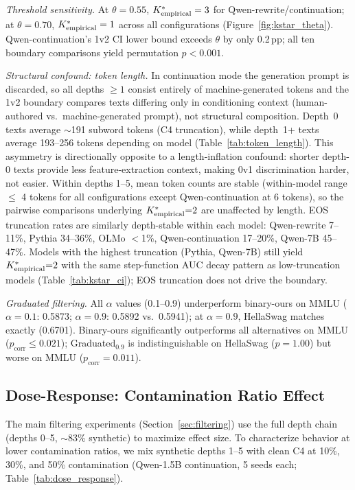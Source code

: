\emph{Threshold sensitivity.}
At $\theta = 0.55$, ${K^*_{\text{empirical}}} = 3$ for Qwen-rewrite/continuation; at $\theta = 0.70$, ${K^*_{\text{empirical}}} = 1$ across all configurations (Figure~\ref{fig:kstar_theta}).
Qwen-continuation's 1v2 CI lower bound exceeds $\theta$ by only 0.2\,pp; all ten boundary comparisons yield permutation $p < 0.001$.

\emph{Structural confound: token length.}
In continuation mode the generation prompt is discarded, so all depths $\geq 1$ consist entirely of machine-generated tokens and the 1v2 boundary compares texts differing only in conditioning context (human-authored vs.\ machine-generated prompt), not structural composition.
Depth~0 texts average ${\sim}$191 subword tokens (C4 truncation), while depth~1+ texts average 193--256 tokens depending on model (Table~\ref{tab:token_length}).
This asymmetry is directionally opposite to a length-inflation confound: shorter depth-0 texts provide less feature-extraction context, making 0v1 discrimination harder, not easier.
Within depths 1--5, mean token counts are stable (within-model range $\leq$ 4 tokens for all configurations except Qwen-continuation at 6 tokens), so the pairwise comparisons underlying ${K^*_{\text{empirical}}}{=}2$ are unaffected by length.
EOS truncation rates are similarly depth-stable within each model: Qwen-rewrite 7--11\%, Pythia 34--36\%, OLMo $<$1\%, Qwen-continuation 17--20\%, Qwen-7B 45--47\%.
Models with the highest truncation (Pythia, Qwen-7B) still yield ${K^*_{\text{empirical}}}{=}2$ with the same step-function AUC decay pattern as low-truncation models (Table~\ref{tab:kstar_ci}); EOS truncation does not drive the boundary.

\emph{Graduated filtering.}
All $\alpha$ values (0.1--0.9) underperform binary-ours on MMLU ($\alpha{=}0.1$: 0.5873; $\alpha{=}0.9$: 0.5892 vs.\ 0.5941); at $\alpha{=}0.9$, HellaSwag matches exactly (0.6701).
Binary-ours significantly outperforms all alternatives on MMLU ($p_{\text{corr}} \leq 0.021$); Graduated$_{0.9}$ is indistinguishable on HellaSwag ($p = 1.00$) but worse on MMLU ($p_{\text{corr}} = 0.011$).
\label{tab:pairwise_significance}

\subsection{Dose-Response: Contamination Ratio Effect}
\label{sec:dose_response}

The main filtering experiments (Section~\ref{sec:filtering}) use the full depth chain (depths 0--5, ${\sim}$83\% synthetic) to maximize effect size.
To characterize behavior at lower contamination ratios, we mix synthetic depths 1--5 with clean C4 at 10\%, 30\%, and 50\% contamination (Qwen-1.5B continuation, 5 seeds each; Table~\ref{tab:dose_response}).

